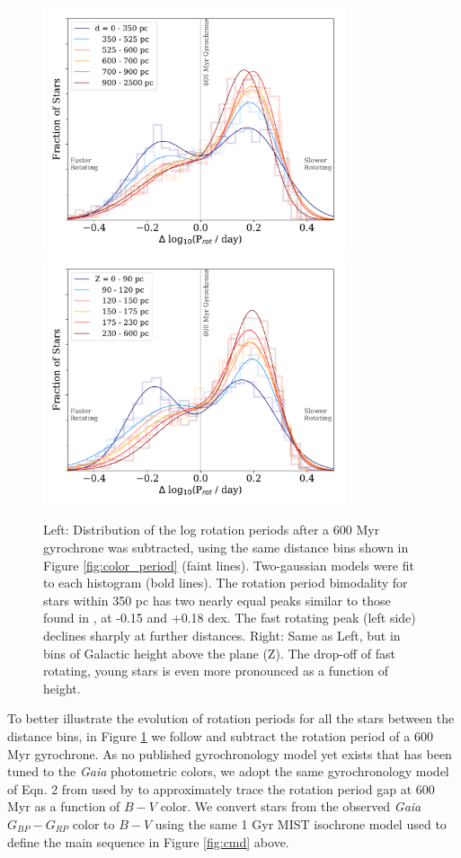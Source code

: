 \documentclass[preprint2]{aastex62}
\begin{document}
\begin{figure}[!t]
\centering
\includegraphics[width=3.5in]{../figures/delta_per_2gauss}
\includegraphics[width=3.5in]{../figures/delta_per_2gauss_Z}
\caption{Left: Distribution of the log rotation periods after a 600 Myr gyrochrone was subtracted, using the same distance bins shown in Figure \ref{fig:color_period} (faint lines). Two-gaussian models were fit to each histogram (bold lines). 
The rotation period bimodality for stars within 350 pc has two nearly equal peaks similar to those found in \citet{davenport2017}, at -0.15 and +0.18 dex. The fast rotating peak (left side) declines sharply at further distances.
Right: Same as Left, but in bins of Galactic height above the plane (Z). The drop-off of fast rotating, young stars is even more pronounced as a function of height.
}
\label{fig:per_hist}
\end{figure}


To better illustrate the evolution of rotation periods for all the stars between the distance bins, in Figure \ref{fig:per_hist} we follow \citet{davenport2017} and subtract the rotation period of a 600 Myr gyrochrone. As no published gyrochronology model yet exists that has been tuned to the {\em Gaia} photometric colors, we adopt the same gyrochronology model of Eqn. 2 from \citet{meibom2009} used by \citet{davenport2017} to approximately trace the rotation period gap at 600 Myr as a function of $B-V$ color. We convert stars from the observed {\em Gaia} $G_{BP}-G_{RP}$ color to $B-V$ using the same 1 Gyr MIST isochrone model used to define the main sequence in Figure \ref{fig:cmd} above. 
\end{document}
